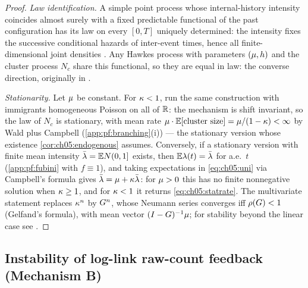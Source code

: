 \begin{proof}
\emph{Law identification.} A simple point process whose internal-history intensity coincides almost
surely with a fixed predictable functional of the past configuration has its law on every $[0,T]$
uniquely determined: the intensity fixes the successive conditional hazards of inter-event times,
hence all finite-dimensional joint densities \citep[Ch.~7.2--7.3]{daley2003}. Any Hawkes process with
parameters $(\mu, h)$ and the cluster process $N_c$ share this functional, so they are equal
in law: the converse direction, originally in \citet{hawkesoakes1974}.

\emph{Stationarity.} Let $\mu$ be constant. For $\kappa < 1$, run the same construction with
immigrants homogeneous Poisson on all of $\mathbb{R}$: the mechanism is shift invariant, so the law of $N_c$
is stationary, with mean rate $\mu \cdot \mathbb{E}[\text{cluster size}] = \mu/(1-\kappa) < \infty$ by Wald
plus Campbell (\cref{app:pf:branching}(i)) --- the stationary version whose existence
\cref{cor:ch05:endogenous} assumes. Conversely, if a stationary version with finite mean intensity
$\bar{\lambda} = \mathbb{E} N(0,1]$ exists, then $\mathbb{E}\lambda(t) = \bar{\lambda}$ for a.e.\ $t$ (\cref{app:pf:fubini} with $f
\equiv 1$), and taking expectations in \cref{eq:ch05:uni} via Campbell's formula gives $\bar{\lambda} =
\mu + \kappa \bar{\lambda}$: for $\mu > 0$ this has no finite nonnegative solution when $\kappa \ge 1$,
and for $\kappa < 1$ it returns \cref{eq:ch05:statrate}. The multivariate statement replaces
$\kappa^n$ by $G^n$, whose Neumann series converges iff $\rho\!\left(G\right) < 1$ (Gelfand's
formula), with mean vector $(I-G)^{-1}\mu$; for stability beyond the linear case see
\citet{bremaud1996}.
\end{proof}
\subsection{Instability of log-link raw-count feedback (Mechanism B)}

